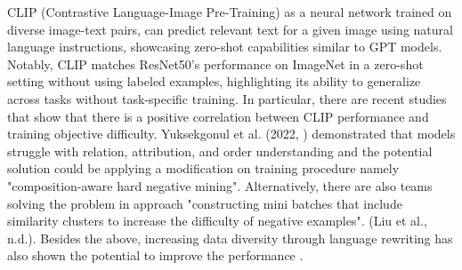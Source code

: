 \documentclass[11pt,letterpaper]{article}
\begin{document}
CLIP (Contrastive Language-Image Pre-Training) as a neural network trained on diverse image-text pairs, can predict relevant text for a given image using natural language instructions, showcasing zero-shot capabilities similar to GPT models. 
Notably, CLIP matches ResNet50's performance on ImageNet in a zero-shot setting without using labeled examples, highlighting its ability to generalize across tasks without task-specific training. 
In particular, there are recent studies that show that there is a positive correlation between CLIP performance and training objective difficulty. 
Yuksekgonul et al. (2022, \cite{yuksekgonul2023visionlanguagemodelsbehavelike}) demonstrated that models struggle with relation, attribution, and order understanding and the potential solution could be applying a modification on training procedure namely "composition-aware hard negative mining". 
Alternatively, there are also teams solving the problem in approach "constructing mini batches that include similarity clusters to increase the difficulty of negative examples". (Liu et al., n.d.). 
Besides the above, increasing data diversity through language rewriting has also shown the potential to improve the performance \cite{fan2023improvingcliptraininglanguage}.
\end{document}
